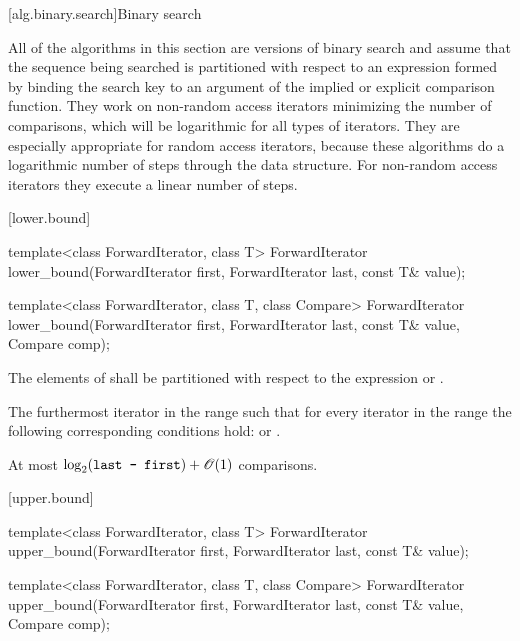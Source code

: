 [alg.binary.search]{Binary search}

\pnum
All of the algorithms in this section are versions of binary search
and assume that the sequence being searched is partitioned with respect to
an expression formed by binding the search key to an argument of the
implied or explicit comparison function.
They work on non-random access iterators minimizing the number of comparisons,
which will be logarithmic for all types of iterators.
They are especially appropriate for random access iterators,
because these algorithms do a logarithmic number of steps
through the data structure.
For non-random access iterators they execute a linear number of steps.

[lower.bound]{}

%
\begin{itemdecl}
template<class ForwardIterator, class T>
  ForwardIterator
    lower_bound(ForwardIterator first, ForwardIterator last,
                const T& value);

template<class ForwardIterator, class T, class Compare>
  ForwardIterator
    lower_bound(ForwardIterator first, ForwardIterator last,
                const T& value, Compare comp);
\end{itemdecl}

\begin{itemdescr}
\pnum
\requires
The elements
of
shall be partitioned with respect to the expression
or
.

\pnum
\returns
The furthermost iterator
in the range
such that for every iterator
in the range
the following corresponding conditions hold:
or
.

\pnum
\complexity
At most
$\log_2(\texttt{last - first}) + \mathscr{O}(1)$
comparisons.
\end{itemdescr}

[upper.bound]{}

%
\begin{itemdecl}
template<class ForwardIterator, class T>
  ForwardIterator
    upper_bound(ForwardIterator first, ForwardIterator last,
                const T& value);

template<class ForwardIterator, class T, class Compare>
  ForwardIterator
    upper_bound(ForwardIterator first, ForwardIterator last,
                const T& value, Compare comp);
\end{itemdecl}

